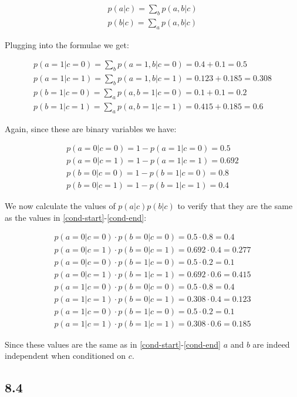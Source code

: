 \documentclass[a4paper, 12pt]{article}
\begin{document}
\begin{align}
	p(a|c) = \sum_b p(a,b|c)\\
	p(b|c) = \sum_a p(a,b|c)
\end{align}

Plugging into the formulae we get:

\begin{align}
	p(a=1|c=0) = \sum_b p(a=1,b|c=0) = 0.4 + 0.1 = 0.5\\
	p(a=1|c=1) = \sum_b p(a=1,b|c=1) = 0.123 + 0.185 = 0.308\\
	p(b=1|c=0) = \sum_a p(a,b=1|c=0) = 0.1 + 0.1 = 0.2\\
	p(b=1|c=1) = \sum_a p(a,b=1|c=1) = 0.415 + 0.185 = 0.6
\end{align}

Again, since these are binary variables we have:

\begin{align}
	p(a=0|c=0) = 1 - p(a=1|c=0) = 0.5\\
	p(a=0|c=1) = 1 - p(a=1|c=1) = 0.692\\
	p(b=0|c=0) = 1 - p(b=1|c=0) = 0.8\\
	p(b=0|c=1) = 1 - p(b=1|c=1) = 0.4
\end{align}

We now calculate the values of $p(a|c)p(b|c)$ to verify that they are the same as the values in \autoref{cond-start}-\autoref{cond-end}:

\begin{align}
	p(a=0|c=0) \cdot p(b=0|c=0) = 0.5 \cdot 0.8 = 0.4\\
	p(a=0|c=1) \cdot p(b=0|c=1) = 0.692 \cdot 0.4 = 0.277\\
	p(a=0|c=0) \cdot p(b=1|c=0) = 0.5 \cdot 0.2 = 0.1\\
	p(a=0|c=1) \cdot p(b=1|c=1) = 0.692 \cdot 0.6 = 0.415\\
	p(a=1|c=0) \cdot p(b=0|c=0) = 0.5 \cdot 0.8 = 0.4\\
	p(a=1|c=1) \cdot p(b=0|c=1) = 0.308 \cdot 0.4 = 0.123\\
	p(a=1|c=0) \cdot p(b=1|c=0) = 0.5 \cdot 0.2 = 0.1\\
	p(a=1|c=1) \cdot p(b=1|c=1) = 0.308 \cdot 0.6 = 0.185
\end{align}

Since these values are the same as in \autoref{cond-start}-\autoref{cond-end} $a$ and $b$ are indeed independent when conditioned on $c$.

\subsection{8.4}
\end{document}
